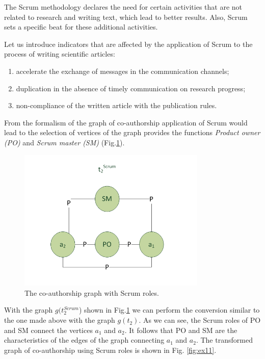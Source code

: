 \documentclass[12pt]{report}
\theoremstyle{definition}
\providecommand{\tightlist}{%
	\setlength{\itemsep}{0pt}\setlength{\parskip}{0pt}}
\begin{document}
The Scrum methodology declares the need for certain activities that are not related to research and writing text, which lead to better results. 
Also, Scrum sets a specific beat for these additional activities.

Let us introduce indicators that are affected by the application of Scrum to the process of writing scientific articles:

\begin{enumerate}
	\tightlist
	\item accelerate the exchange of messages in the communication channels;
	\item duplication in the absence of timely communication on research progress;
	\item non-compliance of the written article with the publication rules.
\end{enumerate}


From the formalism of the graph of co-authorship application of Scrum would lead to the selection of vertices of the graph provides the functions \textit{Product owner (PO)} and \textit{Scrum master (SM)} (Fig.\ref{fig:ex10}).

\begin{figure}[ht]
	\centering
	\includegraphics[width=0.8\textwidth]{scrum_fig10}
	\caption{The co-authorship graph with Scrum roles.}
	\label{fig:ex10}
\end{figure}  

With the graph $g (t_2^{Scrum}$) shown in Fig.\ref{fig:ex10} we can perform the conversion similar to the one made above with the graph $g(t_2)$. 
As we can see, the Scrum roles of PO and SM connect the vertices $a_1$ and $a_2$. 
It follows that PO and SM are the characteristics of the edges of the graph connecting $a_1$ and $a_2$. 
The transformed graph of co-authorship using Scrum roles is shown in Fig. \ref{fig:ex11}.
\end{document}
